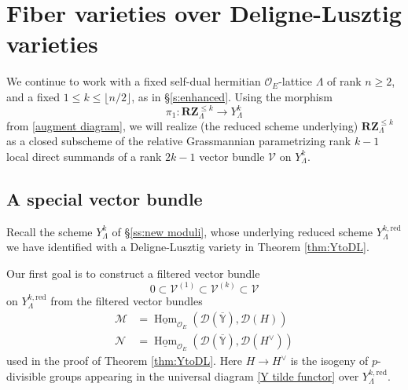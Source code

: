 \documentclass[11pt]{alggeom}
\newcommand{\red}{\mathrm{red}}
\newcommand{\co}{\mathcal O}
\DeclareMathOperator{\Hom}{Hom}
\begin{document}

\section{Fiber varieties  over Deligne-Lusztig varieties}
\label{s:fibration}


We continue to work with  a fixed  self-dual hermitian $\co_E$-lattice $\Lambda$ of rank $n\ge 2$, and a fixed $1\le k\le \lfloor n/2 \rfloor$, as in  \S \ref{s:enhanced}.  Using the morphism  
\[
\pi_1: \mathbf{RZ}^{\le k}_\Lambda \to   Y^k_\Lambda  
\]
from \eqref{augment diagram}, we will realize (the reduced scheme underlying) $\mathbf{RZ}^{\le k}_\Lambda$ as a closed subscheme of the relative Grassmannian parametrizing rank $k-1$ local direct summands of a  rank $2k-1$ vector bundle $\mathscr{V}$ on $Y^k_\Lambda$.






\subsection{A special vector bundle}
\label{ss:special bundle}



Recall the scheme $Y_\Lambda^k$ of \S \ref{ss:new moduli}, whose underlying reduced scheme
$Y_\Lambda^{k,\red} $ we have identified with a Deligne-Lusztig variety in Theorem \ref{thm:YtoDL}. 

 


Our first goal is to construct a  filtered vector bundle 
\begin{equation}\label{Vfilter}
0 \subset \mathscr{V}^{(1)} \subset \mathscr{V}^{(k)} \subset \mathscr{V}
\end{equation}
 on $Y_\Lambda^{k,\red}$ from   the filtered vector bundles 
\begin{align*}
\mathscr{M} &=  \underline{\Hom}_{\co_E} ( \mathscr{D}(  \overline{\mathbb{Y}} ) ,  \mathscr{D}(H) ) \\\mathscr{N} & =   \underline{\Hom}_{\co_E} ( \mathscr{D}(  \overline{\mathbb{Y}} ) ,  \mathscr{D}(H^\vee) )
\end{align*}
used in the proof of Theorem \ref{thm:YtoDL}.
Here $H \to H^\vee$ is the isogeny of  $p$-divisible groups appearing in the universal diagram \eqref{Y tilde functor} over $Y^{k,\red}_\Lambda$.
\end{document}
